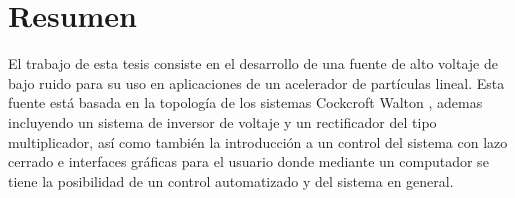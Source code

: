 



\chapter{Resumen} %

El trabajo de esta tesis consiste en el desarrollo de una fuente de alto voltaje de bajo ruido para su uso en aplicaciones de un acelerador de partículas lineal.  Esta fuente está basada en la topología de los sistemas Cockcroft Walton \cite{Cockcroft}, ademas incluyendo  un sistema de inversor de voltaje y un rectificador del tipo multiplicador, así como también la introducción a un control del sistema con lazo cerrado e interfaces gráficas para el usuario donde mediante un computador se tiene la posibilidad de un control automatizado y  del sistema en general. 

